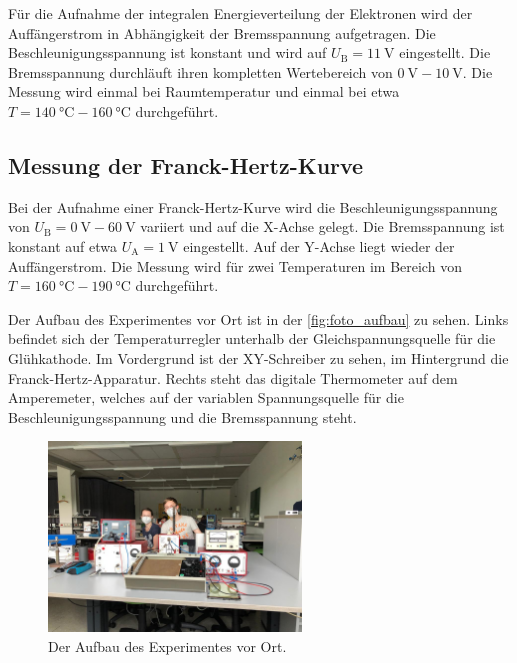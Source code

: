    Für die Aufnahme der integralen Energieverteilung der Elektronen wird der Auffängerstrom in Abhängigkeit der Bremsspannung aufgetragen. 
    Die Beschleunigungsspannung ist konstant und wird auf $U_{\text{B}} = \SI{11}{\volt}$ eingestellt. Die Bremsspannung durchläuft ihren 
    kompletten Wertebereich von $\SI{0}{\volt} - \SI{10}{\volt}$. Die Messung wird einmal bei Raumtemperatur und einmal bei etwa $T = \SI{140}{\celsius} - \SI{160}{\celsius}$
    durchgeführt. 

\subsection{Messung der Franck-Hertz-Kurve}

    Bei der Aufnahme einer Franck-Hertz-Kurve wird die Beschleunigungsspannung von $U_{\text{B}} = \SI{0}{\volt}- \SI{60}{\volt}$ variiert und auf die 
    X-Achse gelegt. Die Bremsspannung ist konstant auf etwa $U_{\text{A}} = \SI{1}{\volt}$ eingestellt. Auf der Y-Achse liegt wieder der Auffängerstrom. 
    Die Messung wird für zwei Temperaturen im Bereich von $T = \SI{160}{\celsius} - \SI{190}{\celsius}$ durchgeführt. 

\noindent Der Aufbau des Experimentes vor Ort ist in der \autoref{fig:foto_aufbau} zu sehen. Links befindet sich der Temperaturregler unterhalb der Gleichspannungsquelle
für die Glühkathode. Im Vordergrund ist der XY-Schreiber zu sehen, im Hintergrund die Franck-Hertz-Apparatur. Rechts steht das digitale Thermometer auf dem Amperemeter, 
welches auf der variablen Spannungsquelle für die Beschleunigungsspannung und die Bremsspannung steht. 

\begin{figure}[H]
    \centering
    \includegraphics[width=0.6\textwidth]{bilder/foto_aufbau.jpeg}
    \caption{Der Aufbau des Experimentes vor Ort.}
    \label{fig:foto_aufbau}
\end{figure}